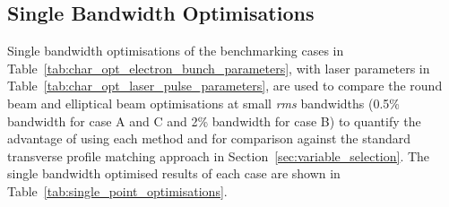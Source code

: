 \documentclass[../main.tex]{subfiles}
\begin{document}
\subsection{Single Bandwidth Optimisations}
\label{sec:single_bandwidth_optimisations}

Single bandwidth optimisations of the benchmarking cases in Table~\ref{tab:char_opt_electron_bunch_parameters}, with laser parameters in Table~\ref{tab:char_opt_laser_pulse_parameters}, are used to compare the round beam and elliptical beam optimisations at small \textit{rms} bandwidths (0.5\%  bandwidth for case A and C and 2\%  bandwidth for case B) to quantify the advantage of using each method and for comparison against the standard transverse profile matching approach in Section~\ref{sec:variable_selection}. The single bandwidth optimised results of each case are shown in Table~\ref{tab:single_point_optimisations}. 
\end{document}
